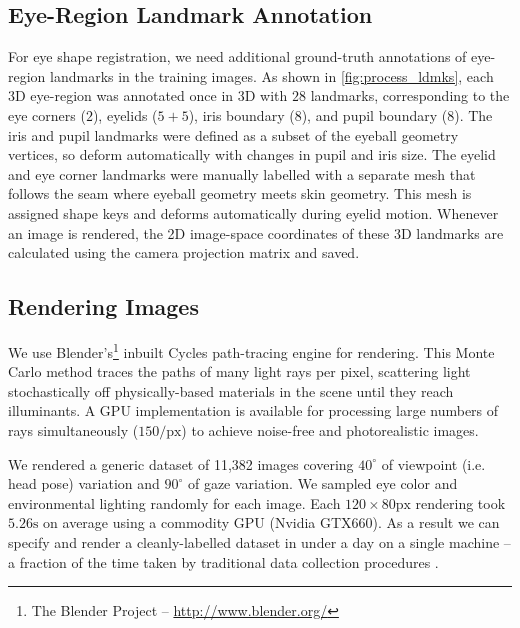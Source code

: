 \subsection{Eye-Region Landmark Annotation}

For eye shape registration, we need additional ground-truth annotations of eye-region landmarks in the training images.
As shown in \autoref{fig:process_ldmks}, each 3D eye-region was annotated once in 3D with $28$ landmarks, corresponding to the eye corners ($2$), eyelids ($5\!+\!5$), iris boundary ($8$), and pupil boundary ($8$).
The iris and pupil landmarks were defined as a subset of the eyeball geometry vertices, so deform automatically with changes in pupil and iris size.
The eyelid and eye corner landmarks were manually labelled with a separate mesh that follows the seam where eyeball geometry meets skin geometry.
This mesh is assigned shape keys and deforms automatically during eyelid motion.
%
Whenever an image is rendered, the 2D image-space coordinates of these 3D landmarks are calculated using the camera projection matrix and saved.

\subsection{Rendering Images}

We use Blender's\footnote{The Blender Project -- \url{http://www.blender.org/}} inbuilt Cycles path-tracing engine for rendering.
This Monte Carlo method traces the paths of many light rays per pixel, scattering light stochastically off physically-based materials in the scene until they reach illuminants.
A GPU implementation is available for processing large numbers of rays simultaneously ($150/\textrm{px}$) to achieve noise-free and photorealistic images.

We rendered a generic \dataset dataset of 11,382 images covering $40^{\circ}$ of viewpoint (i.e. head pose) variation and $90^{\circ}$ of gaze variation.
We sampled eye color and environmental lighting randomly for each image.
Each $120\!\times\!80\textrm{px}$ rendering took $5.26\textrm{s}$ on average using a commodity GPU (Nvidia GTX660).
As a result we can specify and render a cleanly-labelled dataset in under a day on a single machine -- a fraction of the time taken by traditional data collection procedures \cite{zhang15_cvpr}.